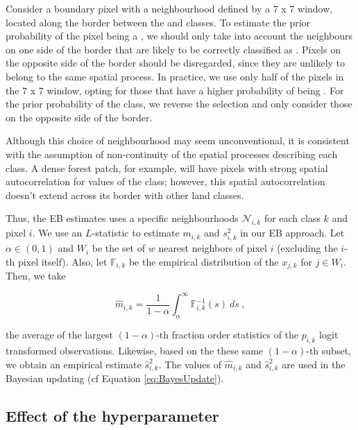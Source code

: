 \documentclass[
  shortnames]{jss}
\begin{document}
Consider a boundary pixel with a neighbourhood defined by a 7 x 7 window, located along the border between the  and  classes. To estimate the prior probability of the pixel being a , we should only take into account the neighbours on one side of the border that are likely to be correctly classified as . Pixels on the opposite side of the border should be disregarded, since they are unlikely to belong to the same spatial process. In practice, we use only half of the pixels in the 7 x 7 window, opting for those that have a higher probability of being . For the prior probability of the  class, we reverse the selection and only consider those on the opposite side of the border.

Although this choice of neighbourhood may seem unconventional, it is consistent with the assumption of non-continuity of the spatial processes describing each class. A dense forest patch, for example, will have pixels with strong spatial autocorrelation for values of the  class; however, this spatial autocorrelation doesn't extend across its border with other land classes.

Thus, the EB estimates uses a specific neighbourhoods \(\mathcal{N}_{i,k}\) for each class \(k\) and pixel \(i\). We use an \(L\)-statistic to estimate \(m_{i,k}\) and \(s^2_{i,k}\) in our EB approach. Let \(\alpha \in (0, 1)\) and \(W_{i}\) be the set of \(w\) nearest neighbors of pixel \(i\) (excluding the \(i\)-th pixel itself). Also, let \(\mathbb{F}_{i,k}\) be the empirical distribution of the \(x_{j,k}\) for \(j \in W_i\).
Then, we take

\begin{equation}
\hat{m}_{i,k} = \frac{1}{1-\alpha} \int_{\alpha}^{\infty} \mathbb{F}_{i,k}^{-1}(s) ~ ds \: , 
\end{equation}

the average of the largest \((1-\alpha)\)-th fraction order statistics of the \(p_{i,k}\) logit transformed observations. Likewise, based on the these same \((1-\alpha)\)-th subset, we obtain an empirical estimate \(\hat{s}^2_{i,k}\). The values of \(\hat{m}_{i,k}\) and \(\hat{s}^2_{i,k}\) are used in the Bayesian updating (cf Equation \ref{eq:BayesUpdate}).

\subsection{Effect of the hyperparameter}\label{effect-of-the-hyperparameter}
\end{document}
